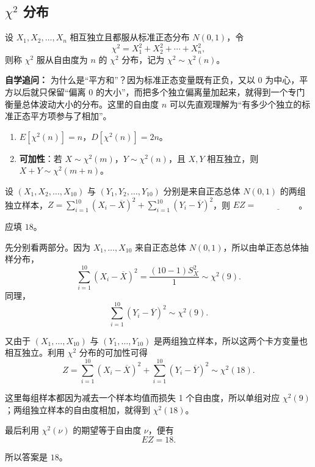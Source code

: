 ﻿\documentclass[lang=cn,11pt]{elegantbook}
\begin{document}
\subsection{\texorpdfstring{\(\chi^2\)}{χ²} 分布}

\begin{definition} \label{def:chi2}
设 \(X_1, X_2, \dots, X_n\) 相互独立且都服从标准正态分布 \(N(0,1)\)，令
\[
\chi^2 = X_1^2 + X_2^2 + \cdots + X_n^2,
\]
则称 \(\chi^2\) 服从自由度为 \(n\) 的 \(\chi^2\) 分布，记为 \(\chi^2 \sim \chi^2(n)\)。
\end{definition}

\begin{note}
\textbf{自学追问：} 为什么是“平方和”？因为标准正态变量既有正负，又以 0 为中心，平方以后就只保留“偏离 0 的大小”，而把多个独立偏离量加起来，就得到一个专门衡量总体波动大小的分布。这里的自由度 \(n\) 可以先直观理解为“有多少个独立的标准正态平方项参与了相加”。
\end{note}

\begin{property}\label{prop:chi2-property} 
\begin{enumerate}
    \item \(E[\chi^2(n)] = n\)，\(D[\chi^2(n)] = 2n\)。
    \item \textbf{可加性}：若 \(X \sim \chi^2(m)\)，\(Y \sim \chi^2(n)\)，且 \(X, Y\) 相互独立，则 \(X + Y \sim \chi^2(m+n)\)。
\end{enumerate}
\end{property}

\begin{exercise}\label{exer:6-chi2-ez}
设 \((X_1, X_2, \dots, X_{10})\) 与 \((Y_1, Y_2, \dots, Y_{10})\) 分别是来自正态总体 \(N(0,1)\) 的两组独立样本，\(Z = \sum_{i=1}^{10}(X_i-\overline{X})^2 + \sum_{i=1}^{10}(Y_i-\overline{Y})^2\)，则 \(EZ =\,\underline{\hspace{2cm}}\)。
\end{exercise}
\begin{solution}
应填 \(18\)。

先分别看两部分。因为 \(X_1,\dots,X_{10}\) 来自正态总体 \(N(0,1)\)，所以由单正态总体抽样分布，
\[
\sum_{i=1}^{10}(X_i-\overline{X})^2=\frac{(10-1)S_X^2}{1}\sim \chi^2(9).
\]
同理，
\[
\sum_{i=1}^{10}(Y_i-\overline{Y})^2\sim \chi^2(9).
\]

又由于 \((X_1,\dots,X_{10})\) 与 \((Y_1,\dots,Y_{10})\) 是两组独立样本，所以这两个卡方变量也相互独立。利用 \(\chi^2\) 分布的可加性可得
\[
Z=\sum_{i=1}^{10}(X_i-\overline{X})^2+\sum_{i=1}^{10}(Y_i-\overline{Y})^2\sim\chi^2(18).
\]

这里每组样本都因为减去一个样本均值而损失 1 个自由度，所以单组对应 \(\chi^2(9)\)；两组独立样本的自由度相加，就得到 \(\chi^2(18)\)。

最后利用 \(\chi^2(\nu)\) 的期望等于自由度 \(\nu\)，便有
\[
EZ=18.
\]

所以答案是 \(18\)。
\end{solution}
\end{document}
